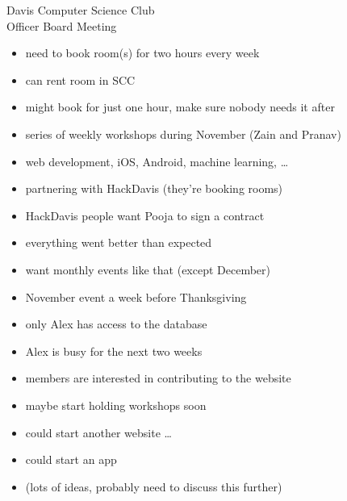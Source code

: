 \documentclass{article}
\begin{document}
\begin{Minutes}{Davis Computer Science Club\\Officer Board Meeting}




\maketitle
{}
\begin{itemize}
\item need to book room(s) for two hours every week
\item can rent room in SCC
\item might book for just one hour, make sure nobody needs it after
\end{itemize}

\begin{itemize}
\item series of weekly workshops during November (Zain and Pranav)
\item web development, iOS, Android, machine learning, \dots
\item partnering with HackDavis (they're booking rooms)
\item HackDavis people want Pooja to sign a contract
\end{itemize}

\begin{itemize}
\item everything went better than expected
\item want monthly events like that (except December)
\item November event a week before Thanksgiving
\end{itemize}

\begin{itemize}
\item only Alex has access to the database
\item Alex is busy for the next two weeks
\item members are interested in contributing to the website
\item maybe start holding workshops soon
\item could start another website \dots
\item could start an app
\item (lots of ideas, probably need to discuss this further)
\end{itemize}


\end{Minutes}
\end{document}
